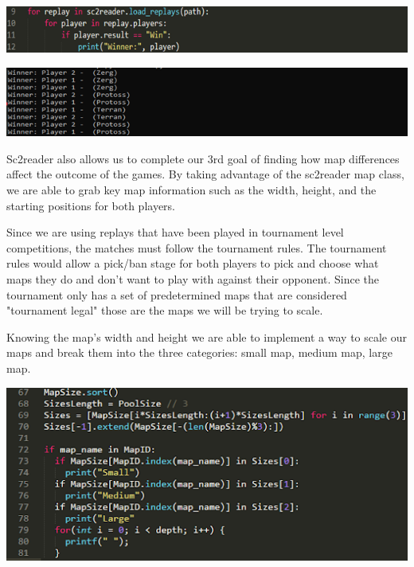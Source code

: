\documentclass[a4paper,12pt]{report}
\begin{document}
\begin{center}
    \captionsetup{type=figure}
    \includegraphics[width=.9\linewidth]{media/SC2readerwinner.png}
\end{center}

\begin{center}
    \captionsetup{type=figure}
    \includegraphics[width=.9\linewidth]{media/winneroutput.png}
\end{center}

Sc2reader also allows us to complete our 3rd goal of finding how map differences affect the outcome of the games. By taking advantage of the sc2reader map class, we are able to grab key map information such as the width, height, and the starting positions for both players.

Since we are using replays that have been played in tournament level competitions, the matches must follow the tournament rules. The tournament rules would allow a pick/ban stage for both players to pick and choose what maps they do and don’t want to play with against their opponent. Since the tournament only has a set of predetermined maps that are considered "tournament legal" those are the maps we will be trying to scale.

Knowing the map’s width and height we are able to implement a way to scale our maps and break them into the three categories: small map, medium map, large map.

\begin{center}
    \captionsetup{type=figure}
    \includegraphics[width=.9\linewidth]{media/MapClassification.png}
\end{center}
\end{document}

